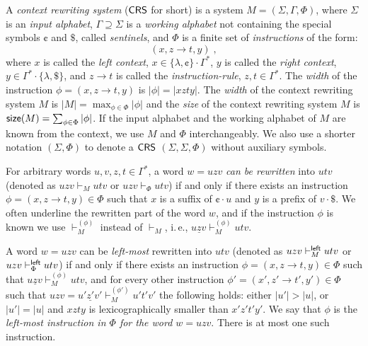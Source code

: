 \begin{definition}\label{definition:crs}
A \emph{context rewriting system} (\index{$\CRS$}\emph{$\CRS$} for short) is a system $M = (\Sigma, \Gamma, \Phi)$, where $\Sigma$ is an \emph{input alphabet}, $\Gamma \supseteq \Sigma$ is a \emph{working alphabet} not containing the special symbols \index{$\cent$}$\cent$ and \index{$\$$}$\$$, called \emph{sentinels}, and $\Phi$ is a finite set of \emph{instructions} of the form:
$$(x, z \to t, y)\;,$$
where $x$ is called the \emph{left context}, $x \in \{\lambda, \cent\}\cdot\Gamma^*$, $y$ is called the \emph{right context}, $y \in \Gamma^*\cdot\{\lambda, \$\}$, and $z \to t$ is called the \emph{instruction-rule}, $z, t \in \Gamma^*$. The \emph{width} of the instruction $\phi = (x, z \to t, y)$ is $|\phi| = |xzty|$. The \emph{width} of the context rewriting system $M$ is $|M| = \max_{\phi \in \Phi} |\phi|$ and the \emph{size} of the context rewriting system $M$ is $\textup{\sf size}(M) = \sum_{\phi \in \Phi} |\phi|$. If the input alphabet and the working alphabet of $M$ are known from the context, we use $M$ and $\Phi$ interchangeably. We also use a shorter notation $(\Sigma, \Phi)$ to denote a $\CRS$ $(\Sigma, \Sigma, \Phi)$ without auxiliary symbols.

For arbitrary words $u, v, z, t \in \Gamma^*$, a word $w = uzv$ \emph{can be rewritten} into $utv$ (denoted as $uzv \vdash_M utv$ or $uzv \vdash_{\Phi} utv$) if and only if there exists an instruction $\phi = (x, z \to t, y) \in \Phi$ such that $x$ is a suffix of $\cent \cdot u$ and $y$ is a prefix of $v \cdot \$ $. We often underline the rewritten part of the word $w$, and if the instruction $\phi$ is known we use $\vdash^{(\phi)}_M$ instead of $\vdash_M$, i.\,e., $u \underline{z} v \vdash^{(\phi)}_M utv$.

A word $w = uzv$ can be \emph{left-most} rewritten into $utv$ (denoted as $uzv \vdash^{\sf left}_M utv$ or $uzv \vdash^{\sf left}_{\Phi} utv$) if and only if there exists an instruction $\phi = (x, z \to t, y) \in \Phi$ such that $u \underline{z} v \vdash^{(\phi)}_M utv$, and for every other instruction $\phi' = (x', z' \to t', y') \in \Phi$ such that $uzv = u' \underline{z'} v' \vdash^{(\phi')}_M u't'v'$ the following holds: either $|u'| > |u|$, or $|u'| = |u|$ and $xzty$ is lexicographically smaller than $x'z't'y'$. We say that $\phi$ is the \emph{left-most instruction in $\Phi$ for the word $w = uzv$}. There is at most one such instruction.


\end{definition}
